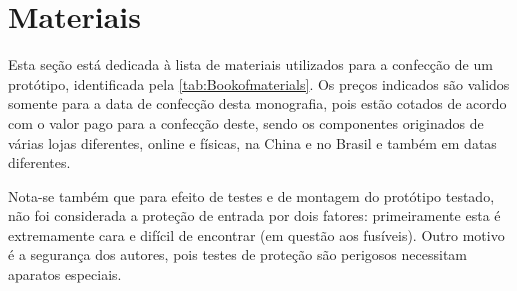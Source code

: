 \section{Materiais}\label{sec:materiais}

Esta seção está dedicada à lista de materiais utilizados para a confecção de um protótipo, identificada pela \autoref{tab:Bookofmaterials}. Os preços indicados são validos somente para a data de confecção desta monografia, pois estão cotados de acordo com o valor pago para a confecção deste, sendo os componentes originados de várias lojas diferentes, online e físicas, na China e no Brasil e também em datas diferentes.

Nota-se também que para efeito de testes e de montagem do protótipo testado, não foi considerada a proteção de entrada por dois fatores: primeiramente esta é extremamente cara e difícil de encontrar (em questão aos fusíveis). Outro motivo é a segurança dos autores, pois testes de proteção são perigosos necessitam aparatos especiais.

